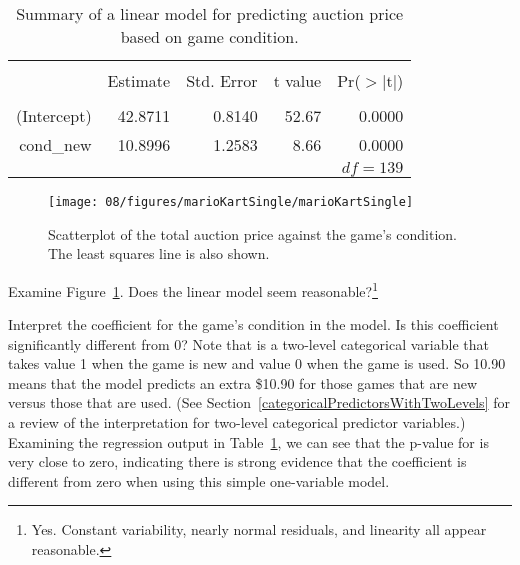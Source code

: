 \begin{table}[ht]
\centering
\begin{tabular}{rrrrr}
  \hline
  \vspace{-3.7mm} & & & & \\
 & Estimate & Std. Error & t value & Pr($>$$|$t$|$) \\ 
  \hline
  \vspace{-3.8mm} & & & & \\
(Intercept) & 42.8711 & 0.8140 & 52.67 & 0.0000 \\ 
  cond\_\hspace{0.3mm}new & 10.8996 & 1.2583 & 8.66 & 0.0000 \\ 
   \hline
   &&&\multicolumn{2}{r}{$df=139$}
\end{tabular}
\caption{Summary of a linear model for predicting auction price based on game condition.}
\label{singleVarModelsForPriceUsingCond}
\end{table}

\begin{figure}
\centering
\texttt{[image: 08/figures/marioKartSingle/marioKartSingle]}
\caption{Scatterplot of the total auction price against the game's condition. The least squares line is also shown.}
\label{marioKartSingle}
\end{figure}

\begin{exercise}
Examine Figure~\ref{marioKartSingle}. Does the linear model seem reasonable?\footnote{Yes. Constant variability, nearly normal residuals, and linearity all appear reasonable.}
\end{exercise}

\begin{example}{Interpret the coefficient for the game's condition in the model. Is this coefficient significantly different from 0?}
Note that  is a two-level categorical variable that takes value 1 when the game is new and value 0 when the game is used. So 10.90 means that the model predicts an extra \$10.90 for those games that are new versus those that are used. (See Section~\ref{categoricalPredictorsWithTwoLevels} for a review of the interpretation for two-level categorical predictor variables.) Examining the regression output in Table~\ref{singleVarModelsForPriceUsingCond}, we can see that the p-value for  is very close to zero, indicating there is strong evidence that the coefficient is different from zero when using this simple one-variable model.
\end{example}

